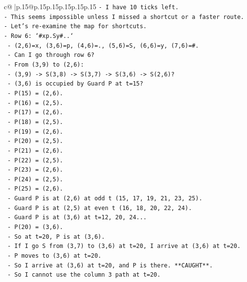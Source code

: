 \documentclass{article}
\begin{document}
{\begin{supertabular}{c@{$\;$}|p{.15\linewidth}@{}p{.15\linewidth}p{.15\linewidth}p{.15\linewidth}p{.15\linewidth}p{.15\linewidth}}
{{{\texttt{{-} I have 10 ticks left.} \\
\texttt{{-} This seems impossible unless I missed a shortcut or a faster route.} \\
\texttt{{-} Let's re{-}examine the map for shortcuts.} \\
\texttt{{-} Row 6: `\#xp.Sy\#..`} \\
\texttt{  {-} (2,6)=x, (3,6)=p, (4,6)=., (5,6)=S, (6,6)=y, (7,6)=\#.} \\
\texttt{  {-} Can I go through row 6?} \\
\texttt{  {-} From (3,9) to (2,6):} \\
\texttt{    {-} (3,9) {-}> S(3,8) {-}> S(3,7) {-}> S(3,6) {-}> S(2,6)?} \\
\texttt{    {-} (3,6) is occupied by Guard P at t=15?} \\
\texttt{    {-} P(15) = (2,6).} \\
\texttt{    {-} P(16) = (2,5).} \\
\texttt{    {-} P(17) = (2,6).} \\
\texttt{    {-} P(18) = (2,5).} \\
\texttt{    {-} P(19) = (2,6).} \\
\texttt{    {-} P(20) = (2,5).} \\
\texttt{    {-} P(21) = (2,6).} \\
\texttt{    {-} P(22) = (2,5).} \\
\texttt{    {-} P(23) = (2,6).} \\
\texttt{    {-} P(24) = (2,5).} \\
\texttt{    {-} P(25) = (2,6).} \\
\texttt{    {-} Guard P is at (2,6) at odd t (15, 17, 19, 21, 23, 25).} \\
\texttt{    {-} Guard P is at (2,5) at even t (16, 18, 20, 22, 24).} \\
\texttt{    {-} Guard P is at (3,6) at t=12, 20, 24...} \\
\texttt{    {-} P(20) = (3,6).} \\
\texttt{    {-} So at t=20, P is at (3,6).} \\
\texttt{    {-} If I go S from (3,7) to (3,6) at t=20, I arrive at (3,6) at t=20.} \\
\texttt{    {-} P moves to (3,6) at t=20.} \\
\texttt{    {-} So I arrive at (3,6) at t=20, and P is there. **CAUGHT**.} \\
\texttt{    {-} So I cannot use the column 3 path at t=20.} \\
}}}
\end{supertabular}}
\end{document}

